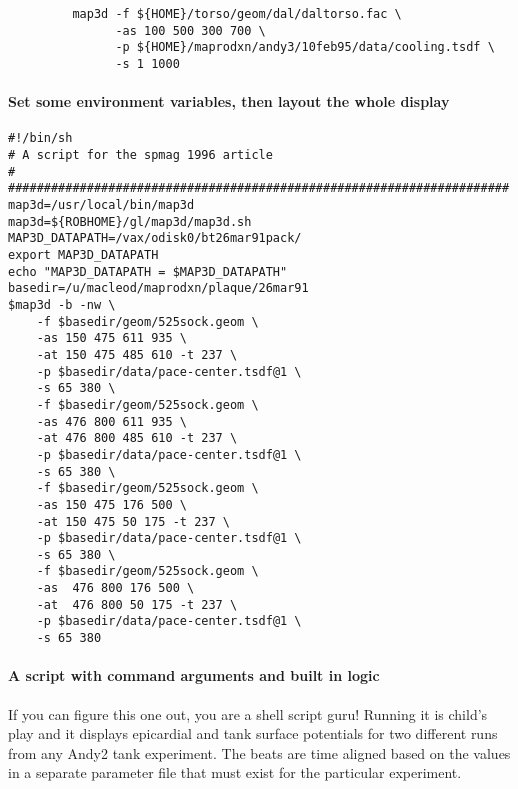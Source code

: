 \begin{verbatim}
         map3d -f ${HOME}/torso/geom/dal/daltorso.fac \
               -as 100 500 300 700 \
               -p ${HOME}/maprodxn/andy3/10feb95/data/cooling.tsdf \
               -s 1 1000
\end{verbatim}

\paragraph{Set some environment variables, then layout the whole display}

\begin{verbatim}
#!/bin/sh
# A script for the spmag 1996 article
#
######################################################################
map3d=/usr/local/bin/map3d
map3d=${ROBHOME}/gl/map3d/map3d.sh
MAP3D_DATAPATH=/vax/odisk0/bt26mar91pack/
export MAP3D_DATAPATH
echo "MAP3D_DATAPATH = $MAP3D_DATAPATH"
basedir=/u/macleod/maprodxn/plaque/26mar91
$map3d -b -nw \
	-f $basedir/geom/525sock.geom \
	-as 150 475 611 935 \
	-at 150 475 485 610 -t 237 \
	-p $basedir/data/pace-center.tsdf@1 \
	-s 65 380 \
	-f $basedir/geom/525sock.geom \
	-as 476 800 611 935 \
	-at 476 800 485 610 -t 237 \
	-p $basedir/data/pace-center.tsdf@1 \
	-s 65 380 \
	-f $basedir/geom/525sock.geom \
	-as 150 475 176 500 \
	-at 150 475 50 175 -t 237 \
	-p $basedir/data/pace-center.tsdf@1 \
	-s 65 380 \
	-f $basedir/geom/525sock.geom \
	-as  476 800 176 500 \
	-at  476 800 50 175 -t 237 \
	-p $basedir/data/pace-center.tsdf@1 \
	-s 65 380 
\end{verbatim}

\paragraph{A script with command arguments and built in logic}

If you can figure this one out, you are a shell script guru!  Running it is
child's play and it displays epicardial and tank surface potentials for two
different runs from any Andy2 tank experiment.  The beats are time aligned
based on the values in a separate parameter file that must exist for the
particular experiment.

